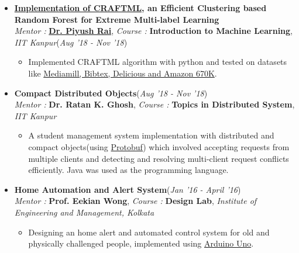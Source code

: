 \documentclass[10pt]{extarticle}
\begin{document}
\begin{itemize}
\begin{itemize}
\end{itemize}









\item \textbf{ \href{https://github.com/NirjharRoy/CRAFTML}{Implementation of CRAFTML}, an Efficient Clustering based Random Forest for Extreme Multi-label Learning} \\
{\textit{Mentor : }}\textbf{\href{https://www.cse.iitk.ac.in/users/piyush/}{Dr. Piyush Rai}}, \textit{{Course : }}\textbf{Introduction to Machine Learning}, \textit{IIT Kanpur}\hfill\hfill(\textit{Aug '18 - Nov '18})
\begin{itemize}
\item Implemented CRAFTML algorithm with python and tested on datasets like \href{http://manikvarma.org/downloads/XC/XMLRepository.html}{Mediamill, Bibtex, Delicious and Amazon 670K}.

\end{itemize}






\item \textbf{Compact Distributed Objects}\hfill\hfill(\textit{Aug '18 - Nov '18})\\{\textit{Mentor : }}\textbf{{Dr. Ratan K. Ghosh}}, \textit{{Course : }}\textbf{Topics in Distributed System}, \textit{IIT Kanpur}
\begin{itemize}
\item A student management system implementation with distributed and compact objects(using \href{https://developers.google.com/protocol-buffers}{Protobuf}) which involved accepting requests from multiple clients and detecting and resolving multi-client request conflicts efficiently. Java was used as the programming language.
\end{itemize}







\item \textbf{Home Automation and Alert System}\hfill\hfill(\textit{Jan '16 - April '16})\\{\textit{Mentor : }}\textbf{{Prof. Eekian Wong}}, \textit{{Course : }}\textbf{Design Lab}, \textit{Institute of Engineering and Management, Kolkata}
\begin{itemize}
\item Designing an home alert and automated control system for old and physically challenged people, implemented using \href{https://www.arduino.cc/en/Guide/ArduinoUno}{Arduino Uno}.
\end{itemize}




\end{itemize}
\end{document}
